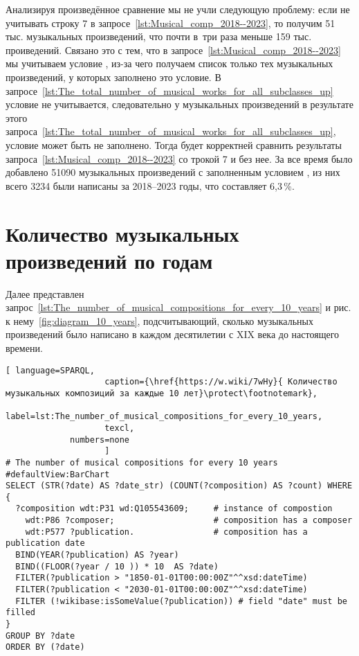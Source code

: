 Анализируя произведённое сравнение  мы не учли следующую проблему: если не учитывать строку 7 в запросе~\ref{lst:Musical_comp_2018--2023}, то получим \num{51} тыс. музыкальных произведений, что почти в~три раза меньше \num{159} тыс. проиведений. Связано это с тем, что в запросе~\ref{lst:Musical_comp_2018--2023} мы учитываем условие , из-за чего получаем список только тех музыкальных произведений, у которых заполнено это условие. В запросе~\ref{lst:The_total_number_of_musical_works_for_all_subclasses_up} условие   не учитывается, следовательно у музыкальных произведений в результате этого запроса~\ref{lst:The_total_number_of_musical_works_for_all_subclasses_up}, условие  может быть не заполнено. Тогда будет корректней сравнить результаты запроса~\ref{lst:Musical_comp_2018--2023} со трокой 7 и без нее. За все время было добавлено \num{51090} музыкальных произведений с заполненным условием , из них всего \num{3234} были написаны за 2018--2023 годы, что составляет 6,3\,\%.

\section{Количество музыкальных произведений по годам}
Далее представлен запрос~\ref{lst:The_number_of_musical_compositions_for_every_10_years} и рис. к нему~\ref{fig:diagram_10_years}, подсчитывающий, сколько музыкальных произведений было написано в каждом десятилетии с XIX века до настоящего времени.

\begin{lstlisting}[ language=SPARQL,
                    caption={\href{https://w.wiki/7wHy}{ Количество музыкальных композиций за каждые 10 лет}\protect\footnotemark},
                    label=lst:The_number_of_musical_compositions_for_every_10_years,
                    texcl,
	         numbers=none
                    ]
# The number of musical compositions for every 10 years
#defaultView:BarChart
SELECT (STR(?date) AS ?date_str) (COUNT(?composition) AS ?count) WHERE {
  ?composition wdt:P31 wd:Q105543609;     # instance of compostion
    wdt:P86 ?composer;                    # composition has a composer
    wdt:P577 ?publication.                # composition has a publication date
  BIND(YEAR(?publication) AS ?year)
  BIND((FLOOR(?year / 10 )) * 10  AS ?date)
  FILTER(?publication > "1850-01-01T00:00:00Z"^^xsd:dateTime)
  FILTER(?publication < "2030-01-01T00:00:00Z"^^xsd:dateTime) 
  FILTER (!wikibase:isSomeValue(?publication)) # field "date" must be filled
}
GROUP BY ?date
ORDER BY (?date)
\end{lstlisting}%

